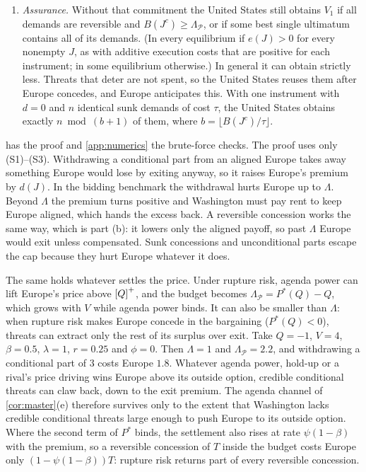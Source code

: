 \begin{proposition}
\begin{enumerate}[label=(\alph*)]
\begin{enumerate}[label=(\roman*)]
  \end{enumerate}
\item \emph{Assurance.} Without that commitment the United States still obtains $V_1$ if all demands are reversible and $B(J^c)\ge\Lambda_{\mathcal P}$, or if some best single ultimatum contains all of its demands. (In every equilibrium if $e(J)>0$ for every nonempty $J$, as with additive execution costs that are positive for each instrument; in some equilibrium otherwise.) In general it can obtain strictly less. Threats that deter are not spent, so the United States reuses them after Europe concedes, and Europe anticipates this. With one instrument with $d=0$ and $n$ identical sunk demands of cost $\tau$, the United States obtains exactly $n \bmod (b+1)$ of them, where $b=\lfloor B(J^c)/\tau\rfloor$.
\end{enumerate}
\end{proposition}

 has the proof and \cref{app:numerics} the brute-force checks. The proof uses only (S1)--(S3). Withdrawing a conditional part from an aligned Europe takes away something Europe would lose by exiting anyway, so it raises Europe's premium by $d(J)$. In the bidding benchmark the withdrawal hurts Europe up to $\Lambda$. Beyond $\Lambda$ the premium turns positive and Washington must pay rent to keep Europe aligned, which hands the excess back. A reversible concession works the same way, which is part (b): it lowers only the aligned payoff, so past $\Lambda$ Europe would exit unless compensated. Sunk concessions and unconditional parts escape the cap because they hurt Europe whatever it does.

The same holds whatever settles the price. Under rupture risk, agenda power can lift Europe's price above $\left[Q\right]^{+}$, and the budget becomes $\Lambda_{\mathcal P}=P^*(Q)-Q$, which grows with $V$ while agenda power binds. It can also be smaller than $\Lambda$: when rupture risk makes Europe concede in the bargaining ($P^*(Q)<0$), threats can extract only the rest of its surplus over exit. Take $Q=-1$, $V=4$, $\beta=0.5$, $\lambda=1$, $r=0.25$ and $\phi=0$. Then $\Lambda=1$ and $\Lambda_{\mathcal P}=2.2$, and withdrawing a conditional part of $3$ costs Europe $1.8$. Whatever agenda power, hold-up or a rival's price driving wins Europe above its outside option, credible conditional threats can claw back, down to the exit premium. The agenda channel of \cref{cor:master}(e) therefore survives only to the extent that Washington lacks credible conditional threats large enough to push Europe to its outside option. Where the second term of $P^*$ binds, the settlement also rises at rate $\psi(1-\beta)$ with the premium, so a reversible concession of $T$ inside the budget costs Europe only $(1-\psi(1-\beta))T$: rupture risk returns part of every reversible concession.

